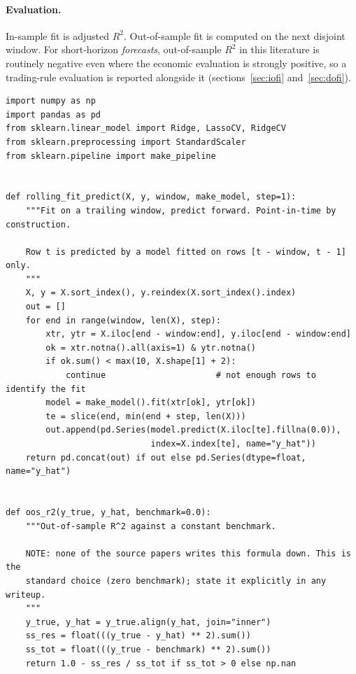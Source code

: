 \documentclass[11pt]{article}
\begin{document}
\paragraph{Evaluation.} In-sample fit is adjusted $R^2$. Out-of-sample fit is
computed on the next disjoint window. For short-horizon \emph{forecasts},
out-of-sample $R^2$ in this literature is routinely negative even where the
economic evaluation is strongly positive, so a trading-rule evaluation is
reported alongside it (sections~\ref{sec:iofi} and~\ref{sec:dofi}).

\begin{lstlisting}[caption={Shared rolling-fit harness. The estimator is injected, so the
same code serves ridge, LASSO and principal-component variants.}]
import numpy as np
import pandas as pd
from sklearn.linear_model import Ridge, LassoCV, RidgeCV
from sklearn.preprocessing import StandardScaler
from sklearn.pipeline import make_pipeline


def rolling_fit_predict(X, y, window, make_model, step=1):
    """Fit on a trailing window, predict forward. Point-in-time by construction.

    Row t is predicted by a model fitted on rows [t - window, t - 1] only.
    """
    X, y = X.sort_index(), y.reindex(X.sort_index().index)
    out = []
    for end in range(window, len(X), step):
        xtr, ytr = X.iloc[end - window:end], y.iloc[end - window:end]
        ok = xtr.notna().all(axis=1) & ytr.notna()
        if ok.sum() < max(10, X.shape[1] + 2):
            continue                      # not enough rows to identify the fit
        model = make_model().fit(xtr[ok], ytr[ok])
        te = slice(end, min(end + step, len(X)))
        out.append(pd.Series(model.predict(X.iloc[te].fillna(0.0)),
                             index=X.index[te], name="y_hat"))
    return pd.concat(out) if out else pd.Series(dtype=float, name="y_hat")


def oos_r2(y_true, y_hat, benchmark=0.0):
    """Out-of-sample R^2 against a constant benchmark.

    NOTE: none of the source papers writes this formula down. This is the
    standard choice (zero benchmark); state it explicitly in any writeup.
    """
    y_true, y_hat = y_true.align(y_hat, join="inner")
    ss_res = float(((y_true - y_hat) ** 2).sum())
    ss_tot = float(((y_true - benchmark) ** 2).sum())
    return 1.0 - ss_res / ss_tot if ss_tot > 0 else np.nan
\end{lstlisting}

\end{document}
